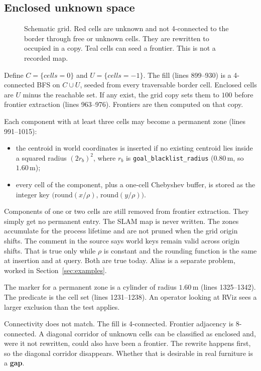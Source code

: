 \documentclass[11pt]{article}
\begin{document}
\subsection{Enclosed unknown space}
\begin{figure}[ht]
\centering
\FigEnclosed
\caption{Schematic grid. Red cells are unknown and not 4-connected to the border through free or unknown cells. They are rewritten to occupied in a copy. Teal cells can seed a frontier. This is not a recorded map.}
\label{fig:enc}
\end{figure}

Define $C=\{cells=0\}$ and $U=\{cells=-1\}$. The fill (lines 899--930) is a 4-connected BFS on $C\cup U$, seeded from every traversable border cell. Enclosed cells are $U$ minus the reachable set. If any exist, the grid copy sets them to $100$ before frontier extraction (lines 963--976). Frontiers are then computed on that copy.

Each component with at least three cells may become a permanent zone (lines 991--1015):
\begin{itemize}
\item the centroid in world coordinates is inserted if no existing centroid lies inside a squared radius $(2 r_b)^2$, where $r_b$ is \texttt{goal\_blacklist\_radius} ($0.80$\,m, so $1.60$\,m);
\item every cell of the component, plus a one-cell Chebyshev buffer, is stored as the integer key $\big(\mathrm{round}(x/\rho),\,\mathrm{round}(y/\rho)\big)$.
\end{itemize}
Components of one or two cells are still removed from frontier extraction. They simply get no permanent entry. The SLAM map is never written. The zones accumulate for the process lifetime and are not pruned when the grid origin shifts. The comment in the source says world keys remain valid across origin shifts. That is true only while $\rho$ is constant and the rounding function is the same at insertion and at query. Both are true today. Alias is a separate problem, worked in Section~\ref{sec:examples}.

The marker for a permanent zone is a cylinder of radius $1.60$\,m (lines 1325--1342). The predicate is the cell set (lines 1231--1238). An operator looking at RViz sees a larger exclusion than the test applies.

Connectivity does not match. The fill is 4-connected. Frontier adjacency is 8-connected. A diagonal corridor of unknown cells can be classified as enclosed and, were it not rewritten, could also have been a frontier. The rewrite happens first, so the diagonal corridor disappears. Whether that is desirable in real furniture is a \textbf{gap}.
\end{document}
